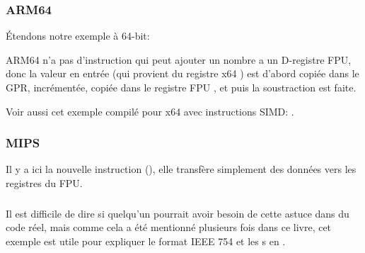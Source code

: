 \subsubsection{ARM64}

Étendons notre exemple à 64-bit:



ARM64 n'a pas d'instruction qui peut ajouter un nombre a un D-registre FPU, donc
la valeur en entrée (qui provient du registre x64 ) est d'abord copiée dans
le \ac{GPR}, incrémentée, copiée dans le registre FPU , et puis la soustraction
est faite.



Voir aussi cet exemple compilé pour x64 avec instructions SIMD: .

\subsubsection{MIPS}


Il y a ici la nouvelle instruction  (), elle transfère
simplement des données vers les registres du FPU.



\subsubsection{\Conclusion}

Il est difficile de dire si quelqu'un pourrait avoir besoin de cette astuce dans
du code réel, mais comme cela a été mentionné plusieurs fois dans ce livre, cet exemple
est utile pour expliquer le format IEEE 754 et les s en \CCpp.
